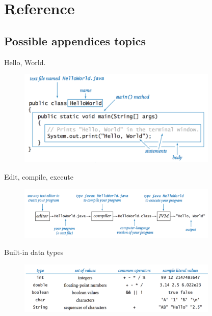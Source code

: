 \chapter{Reference}

\section*{Possible appendices topics}

Hello, World.

\begin{figure}[h]
	\centering
	\includegraphics[width=0.85\textwidth]{images/hello_world_description}
	\label{fig:hello_world_description}
\end{figure}

Edit, compile, execute

\begin{figure}[h]
	\centering
	\includegraphics[width=0.85\textwidth]{images/edit_compile_execute}
	\label{fig:edit_compile_execute}
\end{figure}

Built-in data types

\begin{figure}[h]
	\centering
	\includegraphics[width=0.85\textwidth]{images/data_types}
	\label{fig:data_types}
\end{figure}

